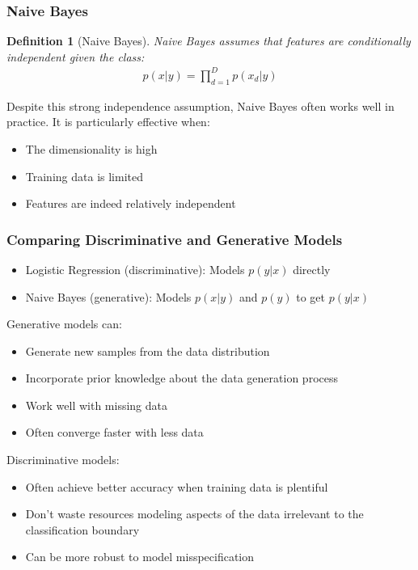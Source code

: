 \documentclass{article}
\newtheorem{definition}{Definition}
\begin{document}
\subsubsection{Naive Bayes}
\begin{definition}[Naive Bayes]
Naive Bayes assumes that features are conditionally independent given the class:
\begin{align}
p(x|y) = \prod_{d=1}^{D}p(x_d|y)
\end{align}
\end{definition}

Despite this strong independence assumption, Naive Bayes often works well in practice. It is particularly effective when:
\begin{itemize}
\item The dimensionality is high
\item Training data is limited
\item Features are indeed relatively independent
\end{itemize}

\subsubsection{Comparing Discriminative and Generative Models}
\begin{itemize}
\item Logistic Regression (discriminative): Models $p(y|x)$ directly
\item Naive Bayes (generative): Models $p(x|y)$ and $p(y)$ to get $p(y|x)$
\end{itemize}

Generative models can:
\begin{itemize}
\item Generate new samples from the data distribution
\item Incorporate prior knowledge about the data generation process
\item Work well with missing data
\item Often converge faster with less data
\end{itemize}

Discriminative models:
\begin{itemize}
\item Often achieve better accuracy when training data is plentiful
\item Don't waste resources modeling aspects of the data irrelevant to the classification boundary
\item Can be more robust to model misspecification
\end{itemize}
\end{document}
